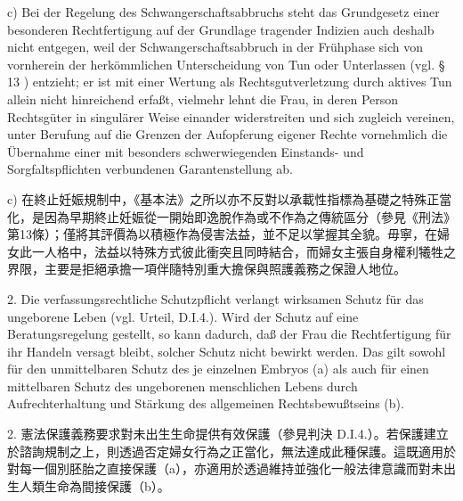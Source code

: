 \documentclass[12pt]{article}
\begin{document}
\begin{sourcepara}[title={原文SondervotumMS.298}]
c) Bei der Regelung des Schwangerschaftsabbruchs steht das Grundgesetz einer besonderen Rechtfertigung auf der Grundlage tragender Indizien auch deshalb nicht entgegen, weil der Schwangerschaftsabbruch in der Frühphase sich von vornherein der herkömmlichen Unterscheidung von Tun oder Unterlassen (vgl. § 13 \abbrStGB{}) entzieht; er ist mit einer Wertung als Rechtsgutverletzung durch aktives Tun allein nicht hinreichend erfaßt, vielmehr lehnt die Frau, in deren Person Rechtsgüter in singulärer Weise einander widerstreiten und sich zugleich vereinen, unter Berufung auf die Grenzen der Aufopferung eigener Rechte vornehmlich die Übernahme einer mit besonders schwerwiegenden Einstands- und Sorgfaltspflichten verbundenen Garantenstellung ab.
\end{sourcepara}
\begin{transpara}
c) 在終止妊娠規制中，《基本法》之所以亦不反對以承載性指標為基礎之特殊正當化，是因為早期終止妊娠從一開始即逸脫作為或不作為之傳統區分（參見《刑法》第13條）；僅將其評價為以積極作為侵害法益，並不足以掌握其全貌。毋寧，在婦女此一人格中，法益以特殊方式彼此衝突且同時結合，而婦女主張自身權利犧牲之界限，主要是拒絕承擔一項伴隨特別重大擔保與照護義務之保證人地位。
\end{transpara}

\begin{sourcepara}[title={原文SondervotumMS.299}]
2. Die verfassungsrechtliche Schutzpflicht verlangt wirksamen Schutz für das ungeborene Leben (vgl. Urteil, D.I.4.). Wird der Schutz auf eine Beratungsregelung gestellt, so kann dadurch, daß der Frau die Rechtfertigung für ihr Handeln versagt bleibt, solcher Schutz nicht bewirkt werden. Das gilt sowohl für den unmittelbaren Schutz des je einzelnen Embryos (a) als auch für einen mittelbaren Schutz des ungeborenen menschlichen Lebens durch Aufrechterhaltung und Stärkung des allgemeinen Rechtsbewußtseins (b).
\end{sourcepara}
\begin{transpara}
2. 憲法保護義務要求對未出生生命提供有效保護（參見判決 D.I.4.）。若保護建立於諮詢規制之上，則透過否定婦女行為之正當化，無法達成此種保護。這既適用於對每一個別胚胎之直接保護（a），亦適用於透過維持並強化一般法律意識而對未出生人類生命為間接保護（b）。
\end{transpara}
\end{document}
